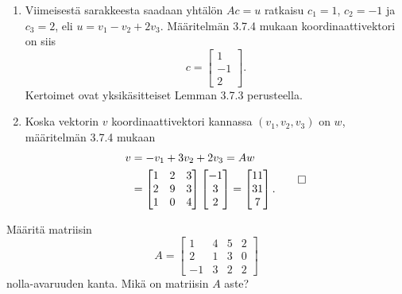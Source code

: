 \documentclass[11pt,a4paper]{amsart}
\begin{document}
\begin{solution}
\begin{enumerate}[label=(\alph*), leftmargin=*]
    \item Viimeisestä sarakkeesta saadaan yhtälön \(Ac=u\) ratkaisu
      \(c_1=1\), \(c_2=-1\) ja \(c_3=2\), eli \(u=v_1-v_2+2v_3\).
      Määritelmän 3.7.4 mukaan koordinaattivektori on siis
      \[
        c=
        \begin{bmatrix}1 \\ -1 \\ 2
        \end{bmatrix}.
      \]
      Kertoimet ovat yksikäsitteiset Lemman 3.7.3 perusteella.

    \item Koska vektorin \(v\) koordinaattivektori kannassa
      \((v_1,v_2,v_3)\) on \(w\), määritelmän 3.7.4 mukaan
      \[
        \begin{aligned}
          v &=-v_1+3v_2+2v_3=Aw \\
          &=
          \begin{bmatrix}
            1 & 2 & 3 \\
            2 & 9 & 3 \\
            1 & 0 & 4
          \end{bmatrix}
          \begin{bmatrix}-1 \\ 3 \\ 2
          \end{bmatrix}
          =
          \begin{bmatrix}11 \\ 31 \\ 7
          \end{bmatrix}.
        \end{aligned}
        \qedhere
      \]
  \end{enumerate}
\end{solution}

\newpage

\begin{exercise}
  Määritä matriisin
  \[
    A =
    \begin{bmatrix}
      1 & 4 & 5 & 2 \\
      2 & 1 & 3 & 0 \\
      -1 & 3 & 2 & 2
    \end{bmatrix}
  \]
  nolla-avaruuden kanta. Mikä on matriisin \(A\) aste?
\end{exercise}
\end{document}
